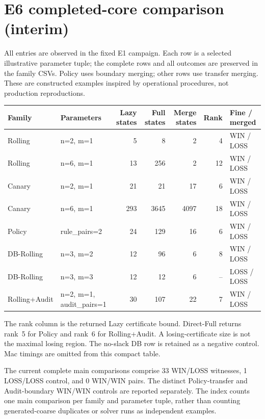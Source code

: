 \documentclass[10pt]{article}
\begin{document}
\section*{E6 completed-core comparison (interim)}
All entries are observed in the fixed E1 campaign. Each row is a selected illustrative parameter tuple; the complete rows and all outcomes are preserved in the family CSVs. Policy uses boundary merging; other rows use transfer merging. These are constructed examples inspired by operational procedures, not production reproductions.

\bigskip
\noindent
\begin{tabular}{llrrrrl}
\toprule
Family & Parameters & Lazy states & Full states & Merge states & Rank & Fine / merged \\
\midrule
Rolling & n=2, m=1 & 5 & 8 & 2 & 4 & WIN / LOSS \\
Rolling & n=6, m=1 & 13 & 256 & 2 & 12 & WIN / LOSS \\
Canary & n=2, m=1 & 21 & 21 & 17 & 6 & WIN / LOSS \\
Canary & n=6, m=1 & 293 & 3645 & 4097 & 18 & WIN / LOSS \\
Policy & rule_pairs=2 & 24 & 129 & 16 & 6 & WIN / LOSS \\
DB-Rolling & n=3, m=2 & 12 & 96 & 6 & 8 & WIN / LOSS \\
DB-Rolling & n=3, m=3 & 12 & 12 & 6 & -- & LOSS / LOSS \\
Rolling+Audit & n=2, m=1, audit_pairs=1 & 30 & 107 & 22 & 7 & WIN / LOSS \\
\bottomrule
\end{tabular}

\bigskip
The rank column is the returned Lazy certificate bound. Direct-Full returns rank~5 for Policy and rank~6 for Rolling+Audit. A losing-certificate size is not the maximal losing region. The no-slack DB row is retained as a negative control. Mac timings are omitted from this compact table.

\medskip
The current complete main comparisons comprise 33 WIN/LOSS witnesses, 1 LOSS/LOSS control, and 0 WIN/WIN pairs. The distinct Policy-transfer and Audit-boundary WIN/WIN controls are reported separately. The index counts one main comparison per family and parameter tuple, rather than counting generated-coarse duplicates or solver runs as independent examples.
\end{document}

